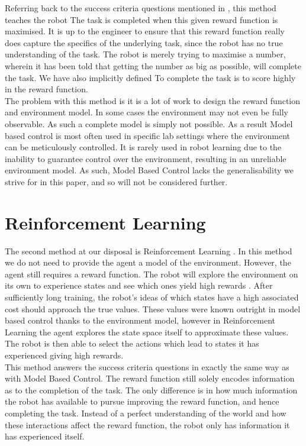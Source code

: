 Referring back to the success criteria questions mentioned in , this method teaches the robot  The task is completed when this given reward function is maximised. It is up to the engineer to ensure that this reward function really does capture the specifics of the underlying task, since the robot has no true understanding of the task. The robot is merely trying to maximise a number, wherein it has been told that getting the number as big as possible, will complete the task. We have also implicitly defined  To complete the task is to score highly in the reward function.\\

The problem with this method is it is a lot of work to design the reward function and environment model. In some cases the environment may not even be fully observable. As such a complete model is simply not possible. As a result Model based control is most often used in specific lab settings where the environment can be meticulously controlled. It is rarely used in  robot learning due to the inability to guarantee control over the environment, resulting in an unreliable environment model. As such, Model Based Control lacks the generalisability we strive for in this paper, and so will not be considered further.

\section{Reinforcement Learning}
\label{sec:reinforcement-learning}
The second method at our disposal is Reinforcement Learning \cite{rl}. In this method we do not need to provide the agent a model of the environment. However, the agent still requires a reward function. The robot will explore the environment on its own to experience states and see which ones yield high rewards \cite{rl-intro-book, rl-book}. After sufficiently long training, the robot's ideas of which states have a high associated cost should approach the true values. These values were known outright in model based control thanks to the environment model, however in Reinforcement Learning the agent explores the state space itself to approximate these values. The robot is then able to select the actions which lead to states it has experienced giving high rewards.\\

This method answers the success criteria questions in exactly the same way as with Model Based Control. The reward function still solely encodes information as to the completion of the task. The only difference is in how much information the robot has available to pursue improving the reward function, and hence completing the task. Instead of a perfect understanding of the world and how these interactions affect the reward function, the robot only has information it has experienced itself.\\

